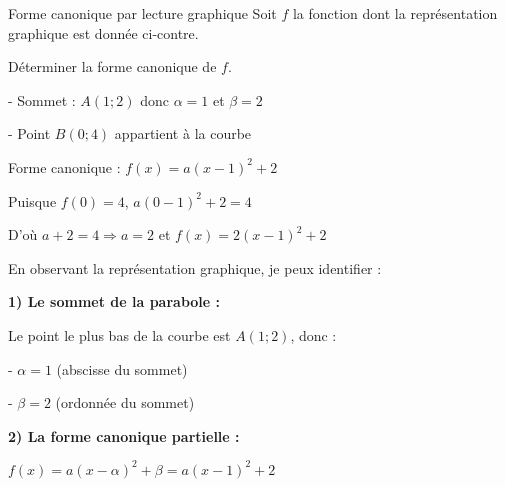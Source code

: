 \begin{EXO}{Forme canonique par lecture graphique}{}
Soit $f$ la fonction dont la représentation graphique est donnée ci-contre. 

\begin{MultiColonnes}{3}
    \tcbitem[raster multicolumn=2]  Déterminer la forme canonique de $f$.

\begin{crep}
- Sommet : $A(1;2)$ donc $\alpha = 1$ et $\beta = 2$

- Point $B(0;4)$ appartient à la courbe

Forme canonique : $f(x) = a(x-1)^2 + 2$

Puisque $f(0) = 4$, $a(0-1)^2 + 2 = 4$

D'où $a + 2 = 4 \Longrightarrow a = 2$ et $f(x) = 2(x-1)^2 + 2$
\end{crep}

    \tcbitem {}
    
\end{MultiColonnes}

\exocorrection

En observant la représentation graphique, je peux identifier :

\textbf{1) Le sommet de la parabole :} 

Le point le plus bas de la courbe est $A(1;2)$, donc :

- $\alpha = 1$ (abscisse du sommet)

- $\beta = 2$ (ordonnée du sommet)

\textbf{2) La forme canonique partielle :}

$f(x) = a(x-\alpha)^2 + \beta = a(x-1)^2 + 2$


\end{EXO}

